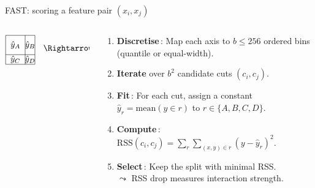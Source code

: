 \documentclass[11pt,compress,t,notes=noshow, aspectratio=169, xcolor=table]{beamer}
\begin{document}
\begin{frame}{FAST: scoring a feature pair $(x_i,x_j)$}
\begin{columns}[T,totalwidth=\textwidth]
\begin{column}{0.4\textwidth}
{\[\begin{array}{@{}l@{\hskip 0.6em}l@{\hskip 0.6em}l@{\hskip 0.6em}l@{\hskip 0.6em}l}
\begin{tikzpicture}[baseline=(current bounding box.center)]
        \draw (0,0) rectangle (1.2,1.2);
        \draw (0.8,0) -- (0.8,1.2); 
        \draw (0,0.4) -- (1.2,0.4); 
        \node at (0.4,0.2) {$\hat{y}_C$};
        \node at (1,0.2) {$\hat{y}_D$};
        \node at (0.4,0.8) {$\hat{y}_A$};
        \node at (1,0.8) {$\hat{y}_B$};
    \end{tikzpicture} & \text{$\Rightarrow$} & \text{$RSS_{b^2}$}\\ 
\end{array}
\]
}
\end{column}
\begin{column}{0.6\textwidth}
\small
\begin{enumerate}\itemsep4pt
  \item<1-> {\bf Discretise}\,: Map each axis to \(b\!\le\!256\) ordered
        bins (quantile or equal-width).
  \item<2-> {\bf Iterate} over \(b^{2}\) candidate cuts
        \((c_i,c_j)\). %
  \item<2-> {\bf Fit}\,: For each cut, assign a constant
        \(\hat y_r\!=\!\text{mean}(y\!\in\!r)\) to
        \(r\!\in\!\{A,B,C,D\}\).
  \item<2-> {\bf Compute}\,:   
        \(\text{RSS}(c_i,c_j)=\sum_{r}
         \sum_{(x,y)\in r}(y-\hat y_r)^{2}\).
  \item<2-> {\bf Select}\,: Keep the split with minimal RSS.\\
  $\leadsto$ RSS drop measures interaction strength. \\%
\end{enumerate}

\end{column}
\end{columns}
\end{frame}
\end{document}
